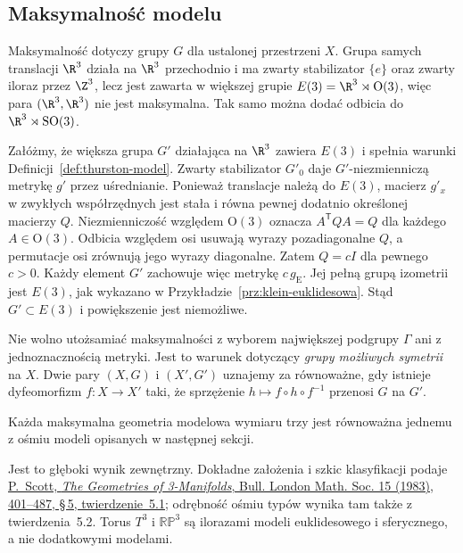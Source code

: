 \subsection*{Maksymalność modelu}

Maksymalność dotyczy grupy $G$ dla ustalonej przestrzeni $X$.
Grupa samych translacji $\R^3$ działa na $\R^3$ przechodnio
i ma zwarty stabilizator $\{e\}$ oraz zwarty iloraz przez $\Z^3$,
lecz jest zawarta w większej grupie
$E(3)=\R^3\rtimes\mathrm O(3)$, więc para $(\R^3,\R^3)$
nie jest maksymalna. Tak samo można dodać odbicia do
$\R^3\rtimes\mathrm{SO}(3)$.

\begin{przyklad}
\label{prz:thurston-euklidesowa-maksymalna}
Załóżmy, że większa grupa $G'$ działająca na $\R^3$ zawiera
$E(3)$ i spełnia warunki Definicji~\ref{def:thurston-model}.
Zwarty stabilizator $G'_0$ daje $G'$-niezmienniczą metrykę
$g'$ przez uśrednianie. Ponieważ translacje należą do $E(3)$,
macierz $g'_x$ w zwykłych współrzędnych jest stała i równa
pewnej dodatnio określonej macierzy $Q$. Niezmienniczość
względem $\mathrm O(3)$ oznacza $A^{\mathsf T}QA=Q$ dla
każdego $A\in\mathrm O(3)$. Odbicia względem osi usuwają
wyrazy pozadiagonalne $Q$, a permutacje osi zrównują jego
wyrazy diagonalne. Zatem $Q=cI$ dla pewnego $c>0$.
Każdy element $G'$ zachowuje więc metrykę $c\,g_{\mathrm E}$.
Jej pełną grupą izometrii jest $E(3)$, jak wykazano w
Przykładzie~\ref{prz:klein-euklidesowa}. Stąd
$G'\subset E(3)$ i powiększenie jest niemożliwe.
\end{przyklad}

Nie wolno utożsamiać maksymalności z wyborem największej
podgrupy $\Gamma$ ani z jednoznacznością metryki. Jest to
warunek dotyczący \emph{grupy możliwych symetrii} na $X$.
Dwie pary $(X,G)$ i $(X',G')$ uznajemy za równoważne, gdy
istnieje dyfeomorfizm $f:X\to X'$ taki, że sprzężenie
$h\mapsto f\circ h\circ f^{-1}$ przenosi $G$ na $G'$.

\begin{twierdzenie}
\label{thm:thurston-osiem-modeli}
Każda maksymalna geometria modelowa wymiaru trzy jest równoważna
jednemu z ośmiu modeli opisanych w następnej sekcji.
\end{twierdzenie}
Jest to głęboki wynik zewnętrzny. Dokładne założenia i szkic
klasyfikacji podaje \href{https://sschleimer.warwick.ac.uk/Teach/2021_3MFDS/References/1983the_geometries_of_three-manifolds.pdf}
{P.\ Scott, \emph{The Geometries of 3-Manifolds},
Bull. London Math. Soc. 15 (1983), 401--487, \S\,5,
twierdzenie~5.1}; odrębność ośmiu typów wynika tam także
z twierdzenia~5.2. Torus $T^3$ i $\mathbb{RP}^3$ są ilorazami
modeli euklidesowego i sferycznego, a nie dodatkowymi modelami.

